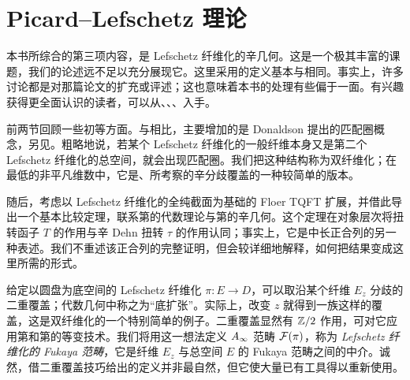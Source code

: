 \chapter{Picard–Lefschetz 理论}\label{chapter:III}
本书所综合的第三项内容，是 Lefschetz 纤维化的辛几何。这是一个极其丰富的课题，我们的论述远不足以充分展现它。这里采用的定义基本与相同。事实上，许多讨论都是对那篇论文的扩充或评述；这也意味着本书的处理有些偏于一面。有兴趣获得更全面认识的读者，可以从、、、入手。

前两节回顾一些初等方面。与相比，主要增加的是 Donaldson 提出的匹配圈概念，另见。粗略地说，若某个 Lefschetz 纤维化的一般纤维本身又是第二个 Lefschetz 纤维化的总空间，就会出现匹配圈。我们把这种结构称为双纤维化；在最低的非平凡维数中，它是、所考察的辛分歧覆盖的一种较简单的版本。

随后，考虑以 Lefschetz 纤维化的全纯截面为基础的 Floer TQFT 扩展，并借此导出一个基本比较定理，联系第的代数理论与第的辛几何。这个定理在对象层次将扭转函子 $T$ 的作用与辛 Dehn 扭转 $\tau$ 的作用认同；事实上，它是中长正合列的另一种表述。我们不重述该正合列的完整证明，但会较详细地解释，如何把结果变成这里所需的形式。

给定以圆盘为底空间的 Lefschetz 纤维化 $\pi:E\to D$，可以取沿某个纤维 $E_z$ 分歧的二重覆盖；代数几何中称之为“底扩张”。实际上，改变 $z$ 就得到一族这样的覆盖，这是双纤维化的一个特别简单的例子。二重覆盖显然有 $\mathbb Z/2$ 作用，可对它应用第和第的等变技术。我们将用这一想法定义 $A_\infty$ 范畴 $\mathcal F(\pi)$，称为 \emph{Lefschetz 纤维化的 Fukaya 范畴}，它是纤维 $E_z$ 与总空间 $E$ 的 Fukaya 范畴之间的中介。诚然，借二重覆盖技巧给出的定义并非最自然，但它使大量已有工具得以重新使用。


